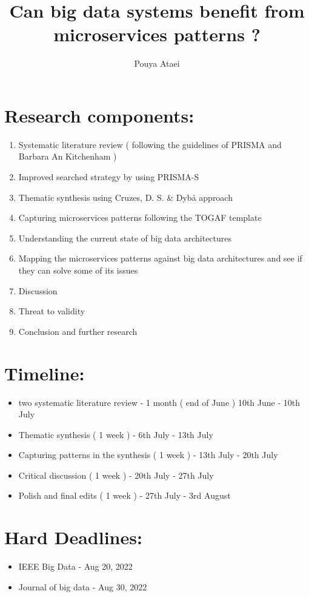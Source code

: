 \documentclass{article}
\title{Can big data systems benefit from microservices patterns ?}
\author{Pouya Ataei}
\theoremstyle{mytheoremstyle}
\theoremstyle{mytheoremstyle}
\theoremstyle{myproblemstyle}
\begin{document}
    \maketitle

    \section{Research components:}

    \begin{enumerate}
        \item Systematic literature review ( following the guidelines of PRISMA and Barbara An Kitchenham ) 
        \item Improved searched strategy by using PRISMA-S
        \item Thematic synthesis using Cruzes, D. S. \& Dybå approach 
        \item Capturing microservices patterns following the TOGAF template 
        \item Understanding the current state of big data architectures  
        \item Mapping the microservices patterns against big data architectures and see if they can solve some of its issues
        \item Discussion
        \item Threat to validity
        \item Conclusion and further research
    \end{enumerate}

    \section{Timeline:}
    \begin{itemize}
        \item two systematic literature review - 1 month ( end of June ) 10th June - 10th July
        \item Thematic synthesis ( 1 week ) - 6th July - 13th July
        \item Capturing patterns in the synthesis ( 1 week ) - 13th July - 20th July 
        \item Critical discussion ( 1 week ) - 20th July - 27th July
        \item Polish and final edits ( 1 week ) -  27th July - 3rd August
    \end{itemize}
    

    \section{Hard Deadlines:}
    \begin{itemize}
        \item IEEE Big Data - Aug 20, 2022
        \item Journal of big data - Aug 30, 2022
    \end{itemize}
\end{document}

